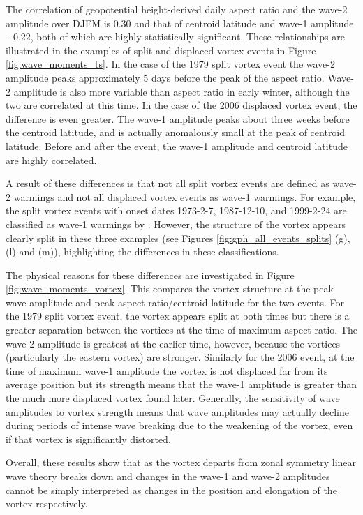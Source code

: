 The correlation of geopotential height-derived daily aspect ratio and the wave-2
amplitude over DJFM is 0.30 and that of centroid latitude and wave-1 amplitude
$-0.22$, both of which are highly statistically significant. These
relationships are illustrated in the examples of split and displaced vortex
events in Figure \ref{fig:wave_moments_ts}. In the case of the 1979 split vortex
event the wave-2 amplitude peaks approximately 5 days before the peak of the
aspect ratio. Wave-2 amplitude is also more variable than aspect ratio in early
winter, although the two are correlated at this time. In the case of the 2006
displaced vortex event, the difference is even greater. The wave-1 amplitude
peaks about three weeks before the centroid latitude, and is actually
anomalously small at the peak of centroid latitude. Before and after the event,
the wave-1 amplitude and centroid latitude are highly correlated.

A result of these differences is that not all split vortex events are defined as
wave-2 warmings and not all displaced vortex events as wave-1 warmings. For
example, the split vortex events with onset dates 1973-2-7, 1987-12-10, and
1999-2-24 are classified as wave-1 warmings by \citet{Bancala2012}. However, the
structure of the vortex appears clearly split in these three examples (see
Figures \ref{fig:gph_all_events_splits} (g), (l) and (m)), highlighting the
differences in these classifications.

The physical reasons for these differences are investigated in Figure
\ref{fig:wave_moments_vortex}. This compares the vortex structure at the peak
wave amplitude and peak aspect ratio/centroid latitude for the two events. For
the 1979 split vortex event, the vortex appears split at both times but there is
a greater separation between the vortices at the time of maximum aspect
ratio. The wave-2 amplitude is greatest at the earlier time, however, because
the vortices (particularly the eastern vortex) are stronger. Similarly for the
2006 event, at the time of maximum wave-1 amplitude the vortex is not displaced
far from its average position but its strength means that the wave-1 amplitude
is greater than the much more displaced vortex found later. Generally, the
sensitivity of wave amplitudes to vortex strength means that wave amplitudes may
actually decline during periods of intense wave breaking due to the weakening of
the vortex, even if that vortex is significantly distorted.

Overall, these results show that as the vortex departs from zonal symmetry
linear wave theory breaks down and changes in the wave-1 and wave-2 amplitudes
cannot be simply interpreted as changes in the position and elongation of the
vortex respectively.


